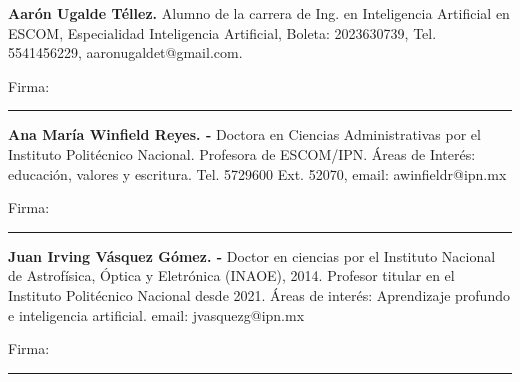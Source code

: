 \documentclass[10pt,letterpaper]{article}
\begin{document}
\vspace{0.6cm}

\begin{minipage}[t]{0.55\textwidth}
    \textbf{Aarón Ugalde Téllez.} Alumno de la carrera de Ing. en Inteligencia Artificial en ESCOM, Especialidad Inteligencia Artificial, Boleta: 2023630739, Tel. 5541456229, aaronugaldet@gmail.com. 
    
    \vspace{0.8cm}
    Firma: \rule{5cm}{0.4pt}
\end{minipage}

\vspace{1cm}


\begin{minipage}[t]{0.55\textwidth}
    \textbf{Ana María Winfield Reyes. -} Doctora en Ciencias Administrativas por el Instituto Politécnico Nacional. Profesora de ESCOM/IPN. Áreas de Interés: educación, valores y escritura. Tel. 5729600 Ext. 52070, email: awinfieldr@ipn.mx
    
    \vspace{0.8cm}
    Firma: \rule{5cm}{0.4pt} 
\end{minipage}

\vspace{1cm}

\begin{minipage}[t]{0.55\textwidth}
    \textbf{Juan Irving Vásquez Gómez. -} Doctor en ciencias por el Instituto Nacional de Astrofísica, Óptica y Eletrónica (INAOE), 2014. Profesor titular en el Instituto Politécnico Nacional desde 2021. Áreas de interés: Aprendizaje profundo e inteligencia artificial. email: jvasquezg@ipn.mx
    
    \vspace{0.8cm}
    Firma: \rule{5cm}{0.4pt}
\end{minipage}
\end{document}
